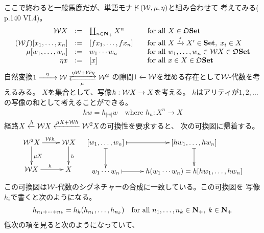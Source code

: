 {	ここで終わると一般馬鹿だが、単語モナド$({\mathcal{W}},\mu,\eta)$と組み合わせて
	考えてみる(\cite{maclane.work} p.140 VI.4)。
	\begin{equation*}\begin{array}{rcll}
		{\mathcal{W}} X &:=& \coprod_{n\in\mathbf{N}_+} X^n 
		&\quad\text{for all } X\in{\mathfrak{O}}{\mathbf{Set}} \\
		({\mathcal{W}} f)[x_1,\dots,x_n] &:=& [fx_1,\dots,fx_n]
		&\quad\text{for all } X\xrightarrow[{}]{f}X'\in{\mathbf{Set}},\; x_i\in X \\
		\mu[w_1,\dots,w_n] &:=& w_1\cdots w_n
		&\quad\text{for all } w_1,\dots,w_n\in{\mathcal{W}} X\in{\mathfrak{O}}{\mathbf{Set}} \\
		\eta x &:=& [x]
		&\quad\text{for all } x\in X\in{\mathfrak{O}}{\mathbf{Set}} \\
	\end{array}\end{equation*}
	自然変換$1\xto[\qquad]{\eta}\clW\xtofrom{\eta\clW+\clW\eta}{\mu}\clW^2$
	の隙間$1\xleftarrow[{}]{}{\mathcal{W}}$を埋める存在として${\mathcal{W}}$-代数を考えるみる。
	$X$を集合として、写像$h:{\mathcal{W}} X\to X$を考える。
	$h$はアリティが$1,2,\dots$の写像の和として考えることができる。
	\begin{equation*}\begin{split}
		hw = h_{|w|}w \quad\text{where } h_n:X^n\to X
	\end{split}\end{equation*}
	経路$X\xleftarrow[{}]{h}{\mathcal{W}} X\xleftarrow[{}]{\mu X+{\mathcal{W}} h}{\mathcal{W}}^2X$の可換性を要求すると、
	次の可換図に帰着する。
	\begin{equation*}\begin{split}
		\xymatrix{
			\clW^2 X \ar[r]^{\clW h} \ar[d]^{\mu X} & \clW X \ar[d]^h \\
			\clW X \ar[r]^h & X
		}\quad\xymatrix{
			[w_1,\dots,w_n] \ar@{|->}[r] \ar@{|->}[d] 
			& [hw_1,\dots,hw_n] \ar@{|->}[d] \\
			w_1\cdots w_n \ar@{|->}[r] & h(w_1\cdots w_n) = h[hw_1,\dots,hw_n]
		}
	\end{split}\end{equation*}
	この可換図は${\mathcal{W}}$-代数のシグネチャーの合成に一致している。この可換図を
	写像$h_i$で書くと次のようになる。
	\begin{equation*}\begin{split}
		h_{n_1+\cdots+n_k} = h_k(h_{n_1},\dots,h_{n_k})
		\quad\text{for all } n_1,\dots,n_k\in\mathbf{N}_+,\; k\in\mathbf{N}_+
	\end{split}\end{equation*}
	低次の項を見ると次のようになっていて、
	\begin{equation*}\begin{split}

\end{split}
\end{equation*}}
